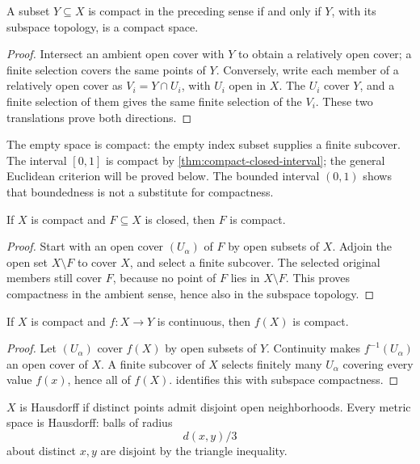 \begin{proposition}
\label{prop:compact-subspace-equivalence}
A subset $Y\subseteq X$ is compact in the preceding sense if and only if
$Y$, with its subspace topology, is a compact space.
\end{proposition}
\begin{proof}
Intersect an ambient open cover with $Y$ to obtain a relatively open cover;
a finite selection covers the same points of $Y$. Conversely, write each
member of a relatively open cover as $V_i=Y\cap U_i$, with $U_i$ open in
$X$. The $U_i$ cover $Y$, and a finite selection of them gives the same
finite selection of the $V_i$. These two translations prove both directions.
\end{proof}
The empty space is compact: the empty index subset supplies a finite
subcover. The interval $[0,1]$
is compact by \cref{thm:compact-closed-interval}; the general
Euclidean criterion will be proved below. The bounded interval $(0,1)$
shows that boundedness is not a substitute for compactness.

\begin{theorem}\label{thm:basic-compactness}
If $X$ is compact and $F\subseteq X$ is closed, then $F$ is compact.
\end{theorem}
\begin{proof}
Start with an open cover $(U_\alpha)$ of $F$ by open subsets of $X$.
Adjoin the open set $X\setminus F$ to cover $X$, and select a finite
subcover. The selected original members still cover $F$, because no point
of $F$ lies in $X\setminus F$. This proves compactness in the ambient
sense, hence also in the subspace topology.
\end{proof}
\begin{theorem}\label{thm:compact-image}
If $X$ is compact and $f:X\to Y$ is continuous, then $f(X)$ is compact.
\end{theorem}
\begin{proof}
Let $(U_\alpha)$ cover $f(X)$ by open subsets of $Y$. Continuity makes
$f^{-1}(U_\alpha)$ an open cover of $X$. A finite subcover of $X$ selects
finitely many $U_\alpha$ covering every value $f(x)$, hence all of $f(X)$.
 identifies this with subspace
compactness.
\end{proof}
\begin{definition}\label{def:hausdorff}
$X$ is Hausdorff if distinct points admit disjoint open neighborhoods.
Every metric space is Hausdorff: balls of radius
\[
d(x,y)/3
\]
 about distinct
$x,y$ are disjoint by the triangle inequality.
\end{definition}
